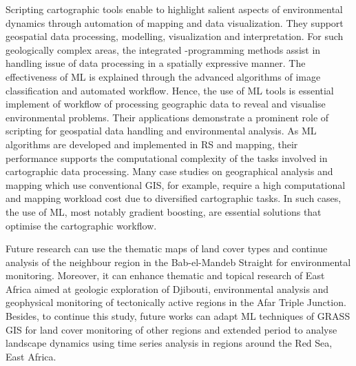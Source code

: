 \documentclass[jimaging,article,submit,pdftex,moreauthors]{Definitions/mdpi}
\begin{document}
Scripting {cartographic} tools{ }enable to highlight salient aspects of environmental dynamics through automation of mapping and data visualization. {They support} geospatial data processing, modelling, visualization and interpretation. For such geologically complex areas, the integrated -programming methods assist in handling issue of data processing in a spatially expressive manner. The{ }effectiveness {of ML }is explained {through } the advanced algorithms of{ }image classification {and automated workflow. }Hence, the use of ML tools is essential implement of workflow of processing geographic data to reveal and visualise environmental problems{. }Their applications {demonstrate a} prominent role of{ }scripting for geospatial data handling{ }and{ }environmental analysis. As ML algorithms are developed and implemented in RS and mapping, their performance supports the computational complexity of the tasks involved in cartographic data processing. Many case studies on geographical analysis and mapping which use conventional GIS, for example, {require a high computational and mapping workload} cost due to diversified cartographic tasks. In such cases, the use of{ }ML, most notably gradient boosting, are essential solutions that optimise the cartographic workflow. 

{Future research can use the }thematic maps of land cover types and {continue analysis of the neighbour} region {in the} Bab-el-Mandeb Straight{ }for environmental monitoring. {Moreover, it can} enhance thematic and topical {research of East Africa aimed at} geologic exploration of Djibouti, environmental analysis and geophysical monitoring of tectonically active regions {in the} Afar Triple Junction. {Besides, to continue this study, future works can adapt }ML techniques of GRASS GIS{ }for land cover monitoring of {other regions and extended period }to analyse landscape dynamics {using time series analysis in regions around the Red Sea, East Africa}. 


\end{document}
